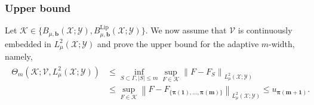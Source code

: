 \documentclass[namedate,webpdf]{ima-authoring-template-blank}
\newcommand*{\Lip}{\mathrm{Lip}}  %
\newcommand*{\nm}[1]{{\left\|#1\right \|}}
\newcommand{\abs}[1]{\left|#1\right|}
\numberwithin{counter}{section}
\numberwithin{equation}{section}
\theoremstyle{plain}
\theoremstyle{definition}
\newcommand*{\cK}{\mathcal{K}}
\newcommand*{\cV}{\mathcal{V}}
\newcommand*{\cX}{\mathcal{X}}
\newcommand*{\cY}{\mathcal{Y}}
\theoremstyle{thmstyletwo}
\begin{document}
\subsubsection{Upper bound}
\label{subsubsec: m-width: upper bound}

Let \(\cK \in \{ B_{\mu, \bm{b}}(\cX; \cY), B_{\mu, \bm{b}}^{\Lip}(\cX; \cY) \}\). We now assume that \(\cV\) is continuously embedded in \(L_{\mu}^2(\cX; \cY)\) and prove the upper bound for the adaptive \(m\)-width, namely,
\begin{align}
    \begin{split}\label{eq: m-width: upper bound}
        \Theta_m(\cK; \cV, L_{\mu}^2(\cX; \cY)) 
        &\leq \inf_{S \subset \Gamma, \abs{S} \leq m} \sup_{F \in \cK} \nm{F - F_S}_{L_{\mu}^2(\cX; \cY)} \\
        &\leq \sup_{F \in \cK} \nm{F - F_{\{\bm{\pi(1)}, \dots, \bm{\pi(m)}\}}}_{L_{\mu}^2(\cX; \cY)}
        \leq u_{\bm{\pi(m+1)}}.
    \end{split}
\end{align}
\end{document}

